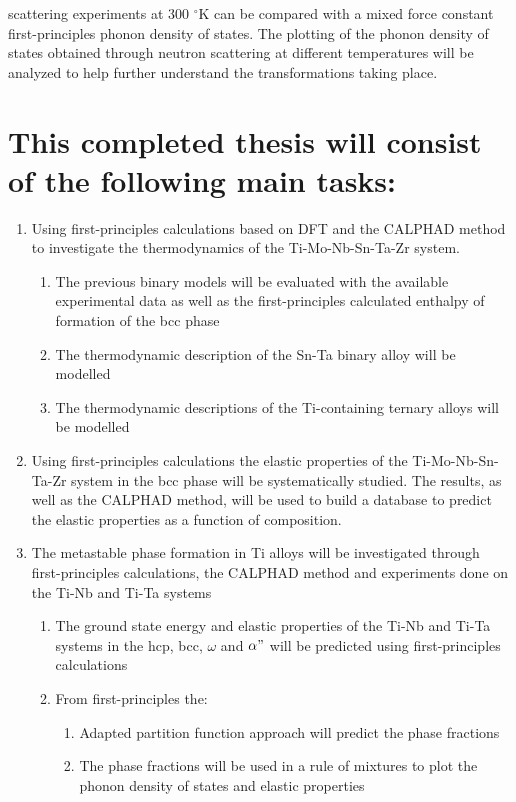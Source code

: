 scattering experiments at 300 $^\circ$K can be compared with a mixed force constant first-principles phonon density of states. The plotting of the phonon density of states obtained through neutron scattering at different temperatures will be analyzed to help further understand the transformations taking place.


\pagebreak
\section*{This completed thesis will consist of the following main tasks:}

\begin{enumerate}
	\item Using first-principles calculations based on DFT and the CALPHAD method to investigate the thermodynamics of the Ti-Mo-Nb-Sn-Ta-Zr system. 
	\begin{enumerate}
		\item The previous binary models will be evaluated with the available experimental data as well as the first-principles calculated enthalpy of formation of the bcc phase
		\item The thermodynamic description of the Sn-Ta binary alloy will be modelled
		\item The thermodynamic descriptions of the Ti-containing ternary alloys will be modelled
	\end{enumerate}
	\item Using first-principles calculations the elastic properties of the Ti-Mo-Nb-Sn-Ta-Zr system in the bcc phase will be systematically studied. The results, as well as the CALPHAD method, will be used to build a database to predict the elastic properties as a function of composition. 
	\item The metastable phase formation in Ti alloys will be investigated through first-principles calculations, the CALPHAD method and experiments done on the Ti-Nb and Ti-Ta systems
	\begin{enumerate}
		\item The ground state energy and elastic properties of the Ti-Nb and Ti-Ta systems in the hcp, bcc, $\omega$ and $\alpha"$ will be predicted using first-principles calculations
		\item From first-principles the:
			\begin{enumerate}
			\item Adapted partition function approach will predict the phase fractions
			\item The phase fractions will be used in a rule of mixtures to plot the phonon density of states and elastic properties

\end{enumerate}
\end{enumerate}
\end{enumerate}
